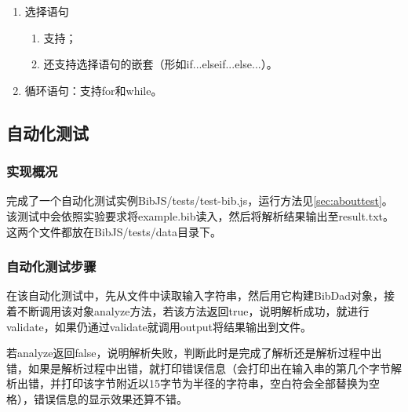 \documentclass[a4paper]{article}
\begin{document}
\begin{CJK*}{UTF8}{gbsn}
\begin{enumerate}
        \item 选择语句
        \begin{enumerate}
            \item 支持；
            \item 还支持选择语句的嵌套（形如if...else{if...else...}）。
        \end{enumerate}

        \item 循环语句：支持for和while。
    \end{enumerate}

    \subsection{自动化测试}
    \subsubsection{实现概况}
    完成了一个自动化测试实例BibJS/tests/test-bib.js，运行方法见\ref{sec:abouttest}。该测试中会依照实验要求将example.bib读入，然后将解析结果输出至result.txt。这两个文件都放在BibJS/tests/data目录下。

    \subsubsection{自动化测试步骤}
    在该自动化测试中，先从文件中读取输入字符串，然后用它构建BibDad对象，接着不断调用该对象analyze方法，若该方法返回true，说明解析成功，就进行validate，如果仍通过validate就调用output将结果输出到文件。
    \par 若analyze返回false，说明解析失败，判断此时是完成了解析还是解析过程中出错，如果是解析过程中出错，就打印错误信息（会打印出在输入串的第几个字节解析出错，并打印该字节附近以15字节为半径的字符串，空白符会全部替换为空格），错误信息的显示效果还算不错。


\end{CJK*}
\end{document}
